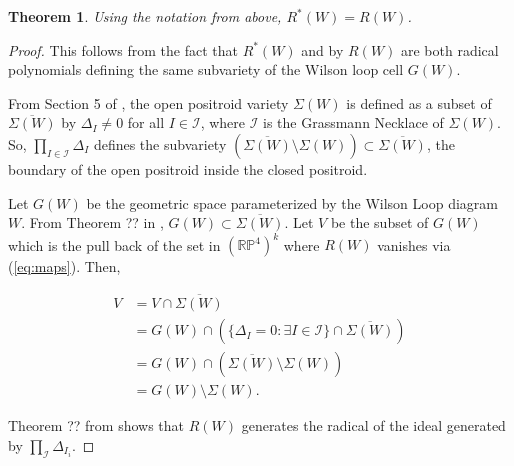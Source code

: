 \documentclass[11pt]{article}
\newtheorem{thm}{Theorem}[section]
\newtheorem{lem}[thm]{Lemma}
\theoremstyle{remark}
\theoremstyle{definition}
\begin{document}



\begin{thm}
Using the notation from above, $R^{\ast}(W) = R(W)$.
\end{thm}

\begin{proof}
This follows from the fact that $R^{\ast}(W)$ and by $R(W)$ are both radical polynomials defining the same subvariety of the Wilson loop cell $G(W)$. 

From Section 5 of \cite{knutsonlamspeyerjuggling}, the open positroid variety $\Sigma(W)$ is defined as a subset of $\overline{\Sigma(W)}$ by $\Delta_I \neq 0$ for all $I \in \mathcal{I}$, where $\mathcal{I}$ is the Grassmann Necklace of $\Sigma(W)$. So, $\prod_{I \in \mathcal{I}} \Delta_I$ defines the subvariety $(\overline{\Sigma(W)} \setminus \Sigma(W)) \subset \overline{\Sigma(W)}$, the boundary of the open positroid inside the closed positroid. 

Let $G(W)$ be the geometric space parameterized by the Wilson Loop diagram $W$. From Theorem ?? in \cite{basisshapeloc}, $G(W) \subset \overline{\Sigma(W)}$. Let $V$ be the subset of $G(W)$ which is the pull back of the set in $(\mathbb{RP}^{4})^{k}$ where $R(W)$ vanishes via (\ref{eq:maps}). Then,

%
\begin{equation} \label{eqn:rw_vanishes}
\begin{split}
V & = V \cap \overline{\Sigma(W)} \\
& = G(W) \cap (\{\Delta_I = 0 : \exists I \in \mathcal{I}\} \cap \overline{\Sigma(W)}) \\
& = G(W) \cap (\overline{\Sigma(W)} \setminus \Sigma(W)) \\
& = G(W) \setminus \Sigma(W).
\end{split}
\end{equation}

Theorem ?? from \cite{generalcombinatorics2} shows that $R(W)$ generates the radical of the ideal generated by $\prod_\mathcal{I} \Delta_{I_i}$.


\end{proof}
\end{document}
